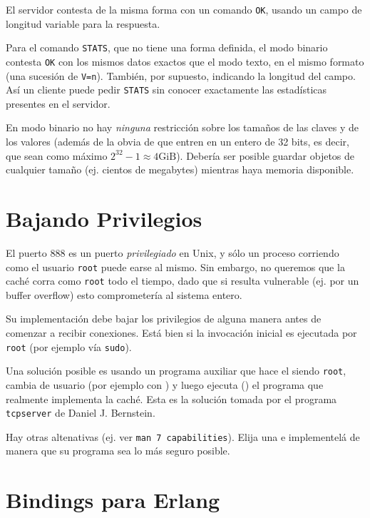 \documentclass[tp]{lcc}
\begin{document}
El servidor contesta de la misma forma con un comando \texttt{OK},
usando un campo de longitud variable para la respuesta.

Para el comando \texttt{STATS}, que no tiene una forma definida, el modo
binario contesta \texttt{OK} con los mismos datos exactos que el modo
texto, en el mismo formato (una sucesión de \texttt{V=n}). También,
por supuesto, indicando la longitud del campo. Así un cliente puede
pedir \texttt{STATS} sin conocer exactamente las estadísticas presentes
en el servidor.

En modo binario no hay \emph{ninguna} restricción sobre los tamaños
de las claves y de los valores (además de la obvia de que entren en un
entero de 32 bits, es decir, que sean como máximo $2^{32} - 1 \approx
4\mathrm{GiB}$).
%
Debería ser posible guardar objetos de cualquier tamaño (ej. cientos
de megabytes) mientras haya memoria disponible.

\section{Bajando Privilegios}

El puerto 888 es un puerto \emph{privilegiado} en Unix, y
sólo un proceso corriendo como el usuario \texttt{root} puede
earse al mismo. Sin embargo, no queremos que la caché
corra como \texttt{root} todo el tiempo, dado que si resulta vulnerable
(ej. por un buffer overflow) esto comprometería al sistema entero.

Su implementación debe bajar los privilegios de alguna manera antes de
comenzar a recibir conexiones.
%
Está bien si la invocación inicial es ejecutada por \texttt{root} (por
ejemplo vía \texttt{sudo}). 

Una solución posible es usando un programa auxiliar que hace el
 siendo \texttt{root}, cambia de usuario (por ejemplo con
) y luego ejecuta () el programa que realmente
implementa la caché. Esta es la solución tomada por el
programa \texttt{tcpserver}\cite{tcpserver} de Daniel J. Bernstein.

Hay otras altenativas (ej. ver \texttt{man 7 capabilities}). Elija una e
implementelá de manera que su programa sea lo más seguro posible.

\section{Bindings para Erlang}
\end{document}
